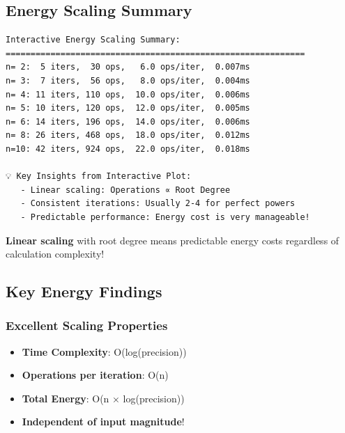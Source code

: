\documentclass[
  letterpaper,
  DIV=11,
  numbers=noendperiod]{scrartcl}
\providecommand{\tightlist}{%
  \setlength{\itemsep}{0pt}\setlength{\parskip}{0pt}}
\begin{document}
\subsection{Energy Scaling Summary}\label{energy-scaling-summary}

\begin{verbatim}
Interactive Energy Scaling Summary:
============================================================
n= 2:  5 iters,  30 ops,   6.0 ops/iter,  0.007ms
n= 3:  7 iters,  56 ops,   8.0 ops/iter,  0.004ms
n= 4: 11 iters, 110 ops,  10.0 ops/iter,  0.006ms
n= 5: 10 iters, 120 ops,  12.0 ops/iter,  0.005ms
n= 6: 14 iters, 196 ops,  14.0 ops/iter,  0.006ms
n= 8: 26 iters, 468 ops,  18.0 ops/iter,  0.012ms
n=10: 42 iters, 924 ops,  22.0 ops/iter,  0.018ms

💡 Key Insights from Interactive Plot:
   - Linear scaling: Operations ∝ Root Degree
   - Consistent iterations: Usually 2-4 for perfect powers
   - Predictable performance: Energy cost is very manageable!
\end{verbatim}

\begin{tcolorbox}[enhanced jigsaw, breakable, colbacktitle=quarto-callout-tip-color!10!white, toprule=.15mm, bottomtitle=1mm, left=2mm, title=\textcolor{quarto-callout-tip-color}{\faLightbulb}\hspace{0.5em}{Energy Efficiency Breakthrough!}, leftrule=.75mm, opacitybacktitle=0.6, bottomrule=.15mm, colframe=quarto-callout-tip-color-frame, opacityback=0, coltitle=black, toptitle=1mm, arc=.35mm, titlerule=0mm, rightrule=.15mm, colback=white]

{\textbf{Linear scaling}} with root degree means predictable energy
costs regardless of calculation complexity!

\end{tcolorbox}

\subsection{Key Energy Findings}\label{key-energy-findings}

\subsubsection{\texorpdfstring{\textbf{Excellent Scaling
Properties}}{Excellent Scaling Properties}}\label{excellent-scaling-properties}

\begin{itemize}
\tightlist
\item
  \textbf{Time Complexity}: O(log(precision))
\item
  \textbf{Operations per iteration}: O(n)
\item
  \textbf{Total Energy}: O(n × log(precision))
\item
  \textbf{Independent of input magnitude}!
\end{itemize}
\end{document}
